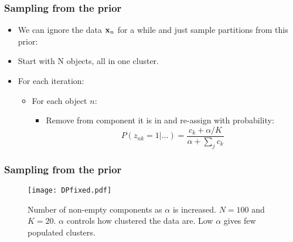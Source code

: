 \begin{frame}
	\frametitle{Sampling from the prior}
	\begin{itemize}
		\item We can ignore the data $\mathbf{x}_n$ for a while and just sample partitions from this prior:
		\item Start with N objects, all in one cluster.
		\item For each iteration:
		\begin{itemize}
			\item For each object $n$:
			\begin{itemize}
				\item Remove from component it is in and re-assign with probability:
				\[
					P(z_{nk} = 1|\ldots) = \frac{c_k + \alpha/K}{\alpha + \sum_j c_k}
				\]
			\end{itemize}
		\end{itemize}
	\end{itemize}
\end{frame}

\begin{frame}
	\frametitle{Sampling from the prior}
	\begin{figure}[tbh]
		\centering\texttt{[image: DPfixed.pdf]}
		\centering\caption{\label{fig:dpfixed}Number of non-empty components as $\alpha$ is increased. $N=100$ and $K=20$. $\alpha$ controls how clustered the data are. Low $\alpha$ gives few populated clusters.}
	\end{figure}
\end{frame}